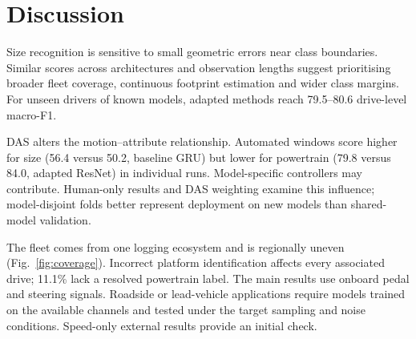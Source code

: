 \section{Discussion}\label{sec:discussion}

Size recognition is sensitive to small geometric errors near class boundaries. Similar scores across architectures and observation lengths suggest prioritising broader fleet coverage, continuous footprint estimation and wider class margins. For unseen drivers of known models, adapted methods reach 79.5--80.6 drive-level macro-F1.

DAS alters the motion--attribute relationship. Automated windows score higher for size (56.4 versus 50.2, baseline GRU) but lower for powertrain (79.8 versus 84.0, adapted ResNet) in individual runs. Model-specific controllers may contribute. Human-only results and DAS weighting examine this influence; model-disjoint folds better represent deployment on new models than shared-model validation.

The fleet comes from one logging ecosystem and is regionally uneven (Fig.~\ref{fig:coverage}). Incorrect platform identification affects every associated drive; 11.1\% lack a resolved powertrain label. The main results use onboard pedal and steering signals. Roadside or lead-vehicle applications require models trained on the available channels and tested under the target sampling and noise conditions. Speed-only external results provide an initial check.
